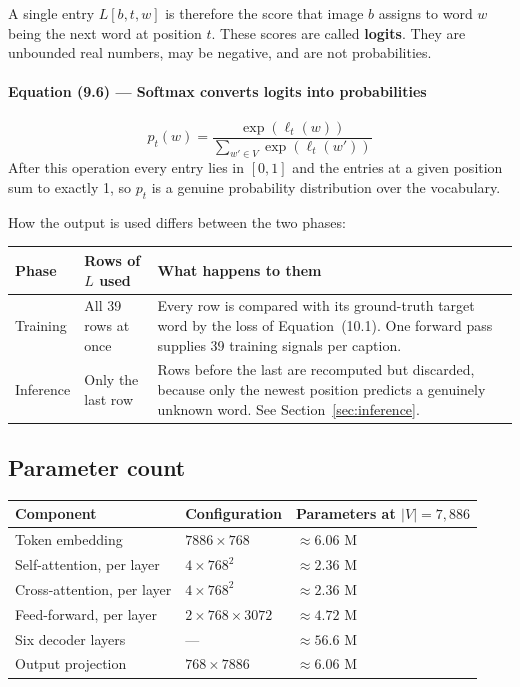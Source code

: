 \documentclass[12pt]{article}
\begin{document}
A single entry $L[b,t,w]$ is therefore the score that image $b$ assigns to word $w$ being the next word at position $t$. These scores are called \textbf{logits}. They are unbounded real numbers, may be negative, and are not probabilities.

\paragraph{Equation (9.6) --- Softmax converts logits into probabilities}
\begin{equation}
p_t(w) = \frac{\exp(\ell_t(w))}{\sum_{w' \in V} \exp(\ell_t(w'))}
\end{equation}
After this operation every entry lies in $[0,1]$ and the entries at a given position sum to exactly 1, so $p_t$ is a genuine probability distribution over the vocabulary.

How the output is used differs between the two phases:

\begin{center}
\begin{tabular}{@{}lL{3.2cm}L{7cm}@{}}
\toprule
Phase & Rows of $L$ used & What happens to them \\
\midrule
Training & All 39 rows at once & Every row is compared with its ground-truth target word by the loss of Equation~(10.1). One forward pass supplies 39 training signals per caption. \\[4pt]
Inference & Only the last row & Rows before the last are recomputed but discarded, because only the newest position predicts a genuinely unknown word. See Section~\ref{sec:inference}. \\
\bottomrule
\end{tabular}
\end{center}

\subsection{Parameter count}

\begin{center}
\begin{tabular}{@{}lll@{}}
\toprule
Component & Configuration & Parameters at $|V|=7{,}886$ \\
\midrule
Token embedding & $7886\times768$ & $\approx 6.06$ M \\
Self-attention, per layer & $4\times768^2$ & $\approx 2.36$ M \\
Cross-attention, per layer & $4\times768^2$ & $\approx 2.36$ M \\
Feed-forward, per layer & $2\times768\times3072$ & $\approx 4.72$ M \\
Six decoder layers & --- & $\approx 56.6$ M \\
Output projection & $768\times7886$ & $\approx 6.06$ M \\
\bottomrule
\end{tabular}
\end{center}
\end{document}
